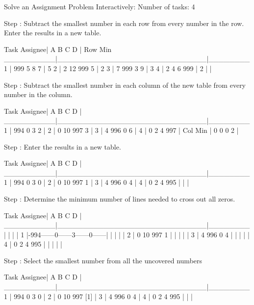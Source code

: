 \documentclass[titlepage, letterpaper]{article}
\begin{document}
\begin{lslisting}
Solve an Assignment Problem Interactively:
Number of tasks:    4

Step :
Subtract the smallest number in each row from every number in the row.
Enter the results in a new table.

                       Task
  Assignee| A      B      C      D      | Row Min
__________|_____________________________|________
     1    | 999    5      8      7      | 5
     2    | 2      12     999    5      | 2
     3    | 7      999    3      9      | 3
     4    | 2      4      6      999    | 2
          |                             | 

Step :
Subtract the smallest number in each column of the new table from every number in the column.

                       Task
  Assignee| A      B      C      D      |
__________|_____________________________|________
     1    | 994    0      3      2      | 
     2    | 0      10     997    3      | 
     3    | 4      996    0      6      | 
     4    | 0      2      4      997    | 
Col Min   | 0      0      0      2      | 

Step :
Enter the results in a new table.


                       Task
  Assignee| A      B      C      D      |
__________|_____________________________|________
     1    | 994    0      3      0      | 
     2    | 0      10     997    1      | 
     3    | 4      996    0      4      | 
     4    | 0      2      4      995    | 
          |                             | 

Step :
Determine the minimum number of lines needed to cross out all zeros.

                       Task
  Assignee| A      B      C      D      |
__________|_____________________________|________
          | |             |             |
     1    |-994------0------3------0------|
          | |             |             |
     2    | 0      10     997    1      |
          | |             |             |
     3    | 4      996    0      4      |
          | |             |             |
     4    | 0      2      4      995    |
          | |             |             |



Step :
Select the smallest number from all the uncovered numbers

                       Task
  Assignee| A      B      C      D      |
__________|_____________________________|________
     1    | 994    0      3      0      | 
     2    | 0      10     997    [1]    | 
     3    | 4      996    0      4      | 
     4    | 0      2      4      995    | 
          |                             | 


\end{lslisting}
\end{document}
